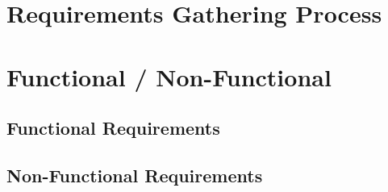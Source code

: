 \section{Requirements Gathering Process}
\section{Functional / Non-Functional}
\subsection{Functional Requirements}
\subsection{Non-Functional Requirements}